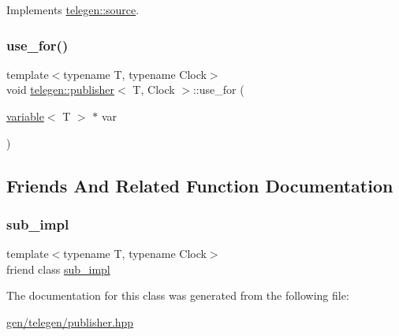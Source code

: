 Implements \hyperlink{classtelegen_1_1source_a224b4eb02ea346aca099615a5ae00ea9}{telegen\+::source}.

\mbox{\label{classtelegen_1_1publisher_a3388c9262a15195d55f224bdd0606e96}} 
\subsubsection{\texorpdfstring{use\+\_\+for()}{use\_for()}}
{\footnotesize\ttfamily template$<$typename T, typename Clock$>$ \\
void \hyperlink{classtelegen_1_1publisher}{telegen\+::publisher}$<$ T, Clock $>$\+::use\+\_\+for (\begin{DoxyParamCaption}\item[{\hyperlink{classtelegen_1_1variable}{variable}$<$ T $>$ $\ast$}]{var }\end{DoxyParamCaption})\hspace{0.3cm}{\ttfamily [inline]}}



\subsection{Friends And Related Function Documentation}
\mbox{\label{classtelegen_1_1publisher_a378ff3f48e0298988ffbb9d03c4f5ac9}} 
\subsubsection{\texorpdfstring{sub\+\_\+impl}{sub\_impl}}
{\footnotesize\ttfamily template$<$typename T, typename Clock$>$ \\
friend class \hyperlink{classtelegen_1_1publisher_1_1sub__impl}{sub\+\_\+impl}\hspace{0.3cm}{\ttfamily [friend]}}



The documentation for this class was generated from the following file\+:\begin{DoxyCompactItemize}
\item 
\hyperlink{gen_2telegen_2publisher_8hpp}{gen/telegen/publisher.\+hpp}\end{DoxyCompactItemize}
